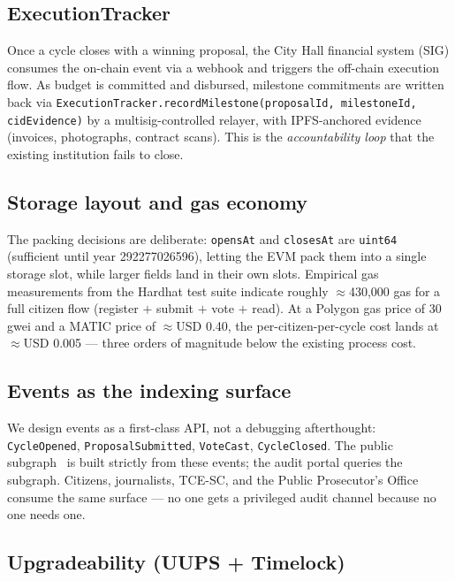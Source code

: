 \documentclass[12pt]{article}
\begin{document}
\subsection{ExecutionTracker}

Once a cycle closes with a winning proposal, the City Hall financial system
(SIG) consumes the on-chain event via a webhook and triggers the off-chain
execution flow. As budget is committed and disbursed, milestone commitments
are written back via \texttt{ExecutionTracker.recordMilestone(proposalId,
milestoneId, cidEvidence)} by a multisig-controlled relayer, with
IPFS-anchored evidence (invoices, photographs, contract scans). This is the
\textit{accountability loop} that the existing institution fails to close.

\subsection{Storage layout and gas economy}

\noindent The packing decisions are deliberate: \texttt{opensAt} and
\texttt{closesAt} are \texttt{uint64} (sufficient until year 292277026596),
letting the EVM pack them into a single storage slot, while larger fields
land in their own slots. Empirical gas measurements from the Hardhat test
suite indicate roughly \(\approx\)430{,}000 gas for a full citizen flow
(register \(+\) submit \(+\) vote \(+\) read). At a
Polygon gas price of 30\,gwei and a MATIC price of \(\approx\)USD 0.40,
the per-citizen-per-cycle cost lands at \(\approx\)USD 0.005 --- three
orders of magnitude below the existing process cost.

\subsection{Events as the indexing surface}

We design events as a first-class API, not a debugging afterthought:
\texttt{CycleOpened}, \texttt{ProposalSubmitted}, \texttt{VoteCast},
\texttt{CycleClosed}. The public subgraph~\cite{thegraphdocs} is built
strictly from these events; the audit portal queries the subgraph. Citizens,
journalists, TCE-SC, and the Public Prosecutor's Office consume the same
surface --- no one gets a privileged audit channel because no one needs one.

\subsection{Upgradeability (UUPS + Timelock)}
\end{document}
